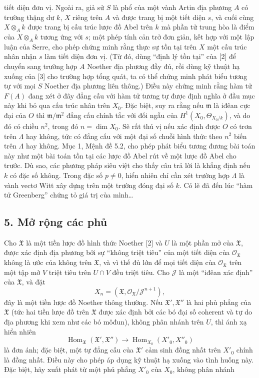 tiết diện đơn vị. Ngoài ra, giả sử $S$ là phổ của một vành Artin địa phương
$A$ có trường thặng dư $k$, $X$ riêng trên $A$ và được trang bị một tiết diện
$s$, và cuối cùng $X\otimes_Ak$ được trang bị cấu trúc lược đồ Abel trên $k$
mà phần tử trung hòa là điểm của $X\otimes_Ak$ tương ứng với $s$; một phép
tính cản trở đơn giản, kết hợp với một lập luận của Serre, cho phép chứng minh
rằng thực sự tồn tại trên $X$ một cấu trúc nhân nhận $s$ làm tiết diện đơn vị.
(Từ đó, dùng ``định lý tồn tại'' của [2] để chuyển sang trường hợp $A$ Noether
địa phương đầy đủ, rồi dùng kỹ thuật hạ xuống của [3] cho trường hợp tổng quát,
ta có thể chứng minh phát biểu tương tự với mọi $S$ Noether địa phương liên
thông.) Điều này chứng minh rằng hàm tử $F(A)$ đang xét ở đây đẳng cấu với hàm
tử tương tự được định nghĩa ở đầu mục này khi bỏ qua cấu trúc nhân trên $X_0$.
Đặc biệt, suy ra rằng nếu $\mathfrak m$ là iđêan cực đại của $O$ thì
$\mathfrak m/\mathfrak m^2$ đẳng cấu chính tắc với đối ngẫu của
$H^1(X_0,\Theta_{X_0/k})$, và do đó có chiều $n^2$, trong đó
$n=\dim X_0$. Sẽ rất thú vị nếu xác định được $O$ có trơn trên $\Lambda$ hay
không, tức có đẳng cấu với một đại số chuỗi hình thức theo $n^2$ biến trên
$\Lambda$ hay không. Mục 1, Mệnh đề 5.2, cho phép phát biểu tương đương bài
toán này như một bài toán tồn tại các lược đồ Abel rút về một lược đồ Abel cho
trước. Dù sao, các phương pháp siêu việt cho thấy câu trả lời là khẳng định nếu
$k$ có đặc số không. Trong đặc số $p\ne0$, hiển nhiên chỉ cần xét trường hợp
$\Lambda$ là vành vectơ Witt xây dựng trên một trường đóng đại số $k$. Có lẽ
đã đến lúc ``hàm tử Greenberg'' chứng tỏ giá trị của mình\ldots

\subsection*{5. Mở rộng các phủ}

Cho $\mathfrak X$ là một tiền lược đồ hình thức Noether [2] và $U$ là một
phần mở của $\mathfrak X$, được xác định địa phương bởi sự ``không triệt tiêu''
của một tiết diện của $\mathcal O_{\mathfrak X}$ không là ước của không trên
$\mathfrak X$, và vì thế đủ lớn để mọi tiết diện của
$\mathcal O_{\mathfrak X}$ trên một tập mở $V$ triệt tiêu trên $U\cap V$ đều
triệt tiêu. Cho $\mathcal J$ là một ``iđêan xác định'' của $\mathfrak X$, và
đặt
\[
  X_n=(\mathfrak X,\mathcal O_{\mathfrak X}/\mathcal J^{n+1}),
\]
đây là một tiền lược đồ Noether thông thường. Nếu
$\mathfrak X',\mathfrak X''$ là hai phủ phẳng của $\mathfrak X$ (tức hai tiền
lược đồ trên $\mathfrak X$ được xác định bởi các bó đại số coherent và tự do
địa phương khi xem như các bó môđun), không phân nhánh trên $U$, thì ánh xạ
hiển nhiên
\[
  \operatorname{Hom}_{\mathfrak X}(\mathfrak X',\mathfrak X'')
  \longrightarrow
  \operatorname{Hom}_{X_0}(X'_0,X''_0)
\]
là đơn ánh; đặc biệt, một tự đẳng cấu của $\mathfrak X'$ cảm sinh đồng nhất
trên $X'_0$ chính là đồng nhất. Điều này cho phép áp dụng kỹ thuật hạ xuống vào
tình huống này. Đặc biệt, hãy xuất phát từ một phủ phẳng $X'_0$ của $X_0$,
không phân nhánh

